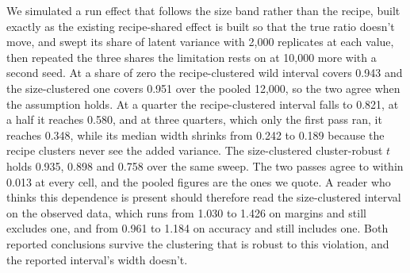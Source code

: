 We simulated a run effect that follows the size band rather than the recipe, built exactly as the existing recipe-shared effect is built so that the true ratio doesn't move, and swept its share of latent variance with 2,000 replicates at each value, then repeated the three shares the limitation rests on at 10,000 more with a second seed. At a share of zero the recipe-clustered wild interval covers 0.943 and the size-clustered one covers 0.951 over the pooled 12,000, so the two agree when the assumption holds. At a quarter the recipe-clustered interval falls to 0.821, at a half it reaches 0.580, and at three quarters, which only the first pass ran, it reaches 0.348, while its median width shrinks from 0.242 to 0.189 because the recipe clusters never see the added variance. The size-clustered cluster-robust $t$ holds 0.935, 0.898 and 0.758 over the same sweep. The two passes agree to within 0.013 at every cell, and the pooled figures are the ones we quote. A reader who thinks this dependence is present should therefore read the size-clustered interval on the observed data, which runs from 1.030 to 1.426 on margins and still excludes one, and from 0.961 to 1.184 on accuracy and still includes one. Both reported conclusions survive the clustering that is robust to this violation, and the reported interval's width doesn't.

